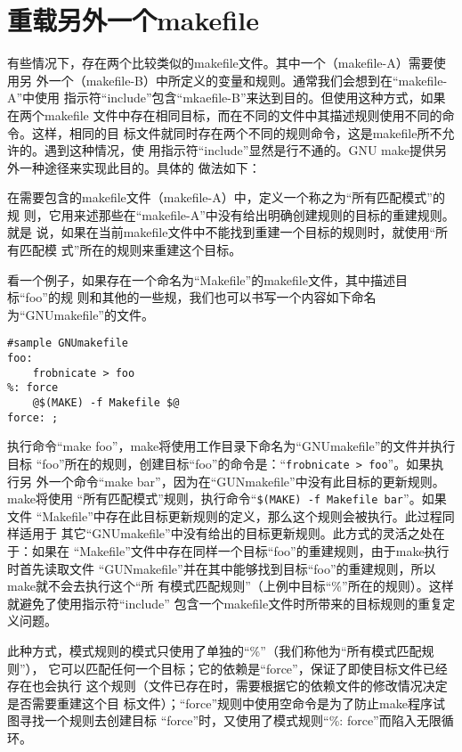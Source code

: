 \section{重载另外一个makefile}
有些情况下，存在两个比较类似的makefile文件。其中一个（makefile-A）需要使用另
外一个（makefile-B）中所定义的变量和规则。通常我们会想到在“makefile-A”中使用
指示符“include”包含“mkaefile-B”来达到目的。但使用这种方式，如果在两个makefile
文件中存在相同目标，而在不同的文件中其描述规则使用不同的命令。这样，相同的目
标文件就同时存在两个不同的规则命令，这是makefile所不允许的。遇到这种情况，使
用指示符“include”显然是行不通的。GNU make提供另外一种途径来实现此目的。具体的
做法如下：

在需要包含的makefile文件（makefile-A）中，定义一个称之为“所有匹配模式”的规
则，它用来述那些在“makefile-A”中没有给出明确创建规则的目标的重建规则。就是
说，如果在当前makefile文件中不能找到重建一个目标的规则时，就使用“所有匹配模
式”所在的规则来重建这个目标。

看一个例子，如果存在一个命名为“Makefile”的makefile文件，其中描述目标“foo”的规
则和其他的一些规，我们也可以书写一个内容如下命名为“GNUmakefile”的文件。

\begin{Verbatim}[]
#sample GNUmakefile
foo:
    frobnicate > foo
%: force
    @$(MAKE) -f Makefile $@
force: ;
\end{Verbatim}

执行命令“make foo”，make将使用工作目录下命名为“GNUmakefile”的文件并执行目标
“foo”所在的规则，创建目标“foo”的命令是：“\verb"frobnicate > foo"”。如果执行另
外一个命令“make bar”，因为在“GUNmakefile”中没有此目标的更新规则。make将使用
“所有匹配模式”规则，执行命令“\verb"$(MAKE) -f Makefile bar"”。如果文件
“Makefile”中存在此目标更新规则的定义，那么这个规则会被执行。此过程同样适用于
其它“GNUmakefile”中没有给出的目标更新规则。此方式的灵活之处在于：如果在
“Makefile”文件中存在同样一个目标“foo”的重建规则，由于make执行时首先读取文件
“GUNmakefile”并在其中能够找到目标“foo”的重建规则，所以make就不会去执行这个“所
有模式匹配规则”（上例中目标“\%”所在的规则）。这样就避免了使用指示符“include”
包含一个makefile文件时所带来的目标规则的重复定义问题。

此种方式，模式规则的模式只使用了单独的“\%”（我们称他为“所有模式匹配规则”），
它可以匹配任何一个目标；它的依赖是“force”，保证了即使目标文件已经存在也会执行
这个规则（文件已存在时，需要根据它的依赖文件的修改情况决定是否需要重建这个目
标文件）；“force”规则中使用空命令是为了防止make程序试图寻找一个规则去创建目标
“force”时，又使用了模式规则“\%: force”而陷入无限循环。

